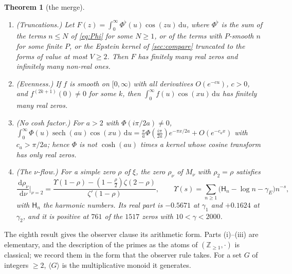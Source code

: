 \documentclass[11pt]{article}
\newtheorem{theorem}{Theorem}[section]
\theoremstyle{definition}\newtheorem{definition}[theorem]{Definition}
\theoremstyle{remark}\newtheorem{remark}[theorem]{Remark}
\newcommand{\dd}{\,\mathrm d}\newcommand{\e}{\mathrm e}
\begin{document}
\begin{theorem}[the merge]\label{mt:merge}
\begin{enumerate}[label=(\roman*)]
\item \emph{(Truncations.)} Let $F(z)=\int_0^\infty\Phi^\flat(u)\cos(zu)\dd u$, where $\Phi^\flat$ is the sum of the terms $n\le N$ of \eqref{eq:Phi} for some $N\ge1$, or of the terms with $P$-smooth $n$ for some finite $P$, or the Epstein kernel of \cref{sec:compare} truncated to the forms of value at most $V\ge2$. Then $F$ has finitely many real zeros and infinitely many non-real ones.
\item \emph{(Evenness.)} If $f$ is smooth on $[0,\infty)$ with all derivatives $O(e^{-cu})$, $c>0$, and $f^{(2k+1)}(0)\ne0$ for some $k$, then $\int_0^\infty f(u)\cos(xu)\dd u$ has finitely many real zeros.
\item \emph{(No cosh factor.)} For $a>2$ with $\Phi(i\pi/2a)\ne0$, $\int_0^\infty\Phi(u)\operatorname{sech}(au)\cos(xu)\dd u=\frac\pi a\Phi(\frac{i\pi}{2a})e^{-\pi x/2a}+O(e^{-c_ax})$ with $c_a>\pi/2a$; hence $\Phi$ is not $\cosh(au)$ times a kernel whose cosine transform has only real zeros.
\item \emph{(The $\nu$-flow.)} For a simple zero $\rho$ of $\xi$, the zero $\rho_\nu$ of $M_\nu$ with $\rho_2=\rho$ satisfies
\[
\frac{\dd\rho_\nu}{\dd\nu}\Big|_{\nu=2}=\frac{\Upsilon(1-\rho)-(1-\frac\rho2)\zeta(2-\rho)}{\zeta'(1-\rho)},\qquad \Upsilon(s)=\sum_{n\ge1}\bigl(\mathsf H_n-\log n-\gamma_E\bigr)n^{-s},
\]
with $\mathsf H_n$ the harmonic numbers. Its real part is $-0.5671$ at $\gamma_1$ and $+0.1624$ at $\gamma_2$, and it is positive at $761$ of the $1517$ zeros with $10<\gamma<2000$.
\end{enumerate}
\end{theorem}

The eighth result gives the observer clause its arithmetic form. Parts (i)--(iii) are elementary, and the description of the primes as the atoms of $(\mathbb Z_{\ge1},\cdot)$ is classical; we record them in the form that the observer rule takes. For a set $G$ of integers $\ge2$, $\langle G\rangle$ is the multiplicative monoid it generates.
\end{document}
